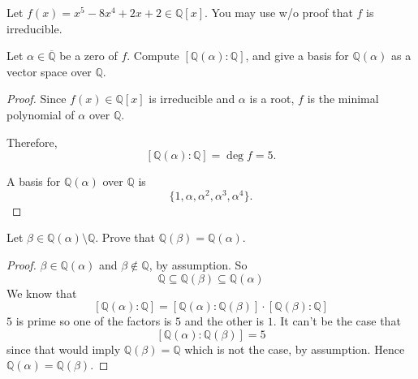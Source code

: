 \newpage 
\begin{prob}
    Let $f(x) = x^5 - 8x^4 + 2x + 2 \in \mathbb Q[x]$. You may use 
    w/o proof that $f$ is irreducible. 

    Let $\alpha \in \overline{\mathbb Q}$ be a zero of 
    $f$. Compute $[\mathbb Q(\alpha) : \mathbb Q]$, and give 
    a basis for $\mathbb Q(\alpha)$ as a vector space over 
    $\mathbb Q$.
\end{prob}
\begin{proof}
    Since $f(x) \in \mathbb{Q}[x]$ is irreducible and $\alpha$ 
    is a root,
    $f$ is the minimal polynomial of $\alpha$ over $\mathbb{Q}$.

    Therefore,
    \[
        [\mathbb{Q}(\alpha) : \mathbb{Q}] = \deg f = 5.
    \]

    A basis for $\mathbb{Q}(\alpha)$ over $\mathbb{Q}$ is
    \[
        \{1,\alpha,\alpha^2,\alpha^3,\alpha^4\}.
    \]
\end{proof}
\begin{prob}
    Let $\beta \in \mathbb Q(\alpha) \setminus \mathbb Q$. 
    Prove that $\mathbb Q(\beta) = \mathbb Q(\alpha)$.
\end{prob}
\begin{proof}
    $\beta \in \mathbb Q(\alpha)$ and $\beta \not \in \mathbb Q$, 
    by assumption. So 
    \[
        \mathbb Q \subseteq \mathbb Q(\beta) \subseteq 
        \mathbb Q(\alpha)
    \]
    We know that 
    \[
        [\mathbb Q(\alpha) : \mathbb Q] = 
        [\mathbb Q(\alpha) : \mathbb Q(\beta)] \cdot 
        [\mathbb Q(\beta) : \mathbb Q]
    \]
    $5$ is prime so one of the factors is $5$ and the other is $1$. 
    It can't be the case that 
    \[
        [\mathbb Q(\alpha) : \mathbb Q(\beta)] = 5
    \]
    since that would imply $\mathbb Q(\beta) = \mathbb Q$ which 
    is not the case, by assumption. Hence 
    $\mathbb Q(\alpha) = \mathbb Q(\beta)$.
\end{proof}

\newpage 
